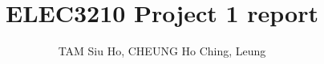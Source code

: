\documentclass[10pt]{article}
\begin{document}
\author{TAM Siu Ho, CHEUNG Ho Ching, Leung } %
\title{ELEC3210 Project 1 report}
\maketitle



\end{document}

